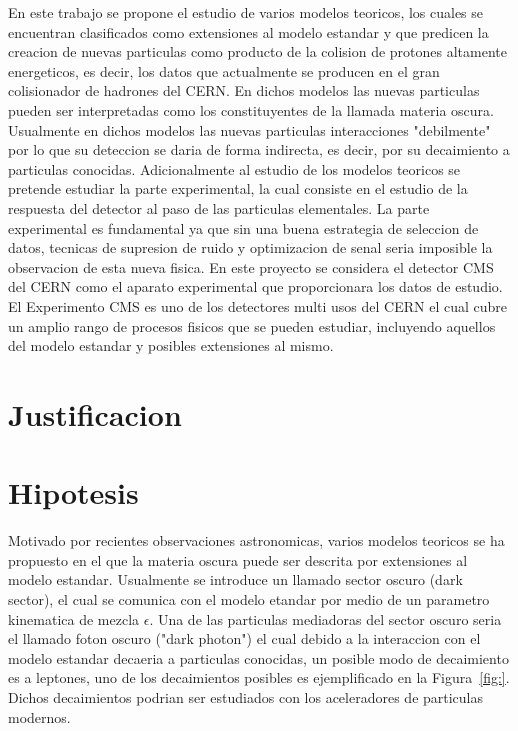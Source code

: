 En este trabajo se propone el estudio de varios modelos teoricos, los cuales se encuentran clasificados como extensiones al modelo estandar y que predicen la creacion de nuevas particulas como producto de la colision de protones altamente energeticos, es decir, los datos que actualmente se producen en el gran colisionador de hadrones del CERN.  En dichos modelos las nuevas particulas pueden ser interpretadas como los constituyentes de la llamada materia oscura.  Usualmente en dichos modelos las nuevas particulas interacciones "debilmente" por lo que su deteccion se daria de forma indirecta, es decir, por su decaimiento a particulas conocidas.  Adicionalmente al estudio de los modelos teoricos se pretende estudiar la parte experimental, la cual consiste en el estudio de la respuesta del detector al paso de las particulas elementales.  La parte experimental es fundamental ya que sin una buena estrategia de seleccion de datos, tecnicas de supresion de ruido y optimizacion de senal seria imposible la observacion de esta nueva fisica. En este proyecto se considera el detector CMS del CERN como el aparato experimental que proporcionara los datos de estudio.  El Experimento CMS es uno de los detectores multi usos del CERN el cual cubre un amplio rango de procesos fisicos que se pueden estudiar, incluyendo aquellos del modelo estandar y posibles extensiones al mismo. 


\chapter{Justificacion}



\chapter{Hipotesis}
Motivado por recientes observaciones astronomicas, varios modelos teoricos se ha propuesto en el que la materia oscura puede ser descrita por extensiones al modelo estandar. Usualmente se introduce un llamado sector oscuro (dark sector), el cual se comunica con el modelo etandar por medio de un parametro kinematica de mezcla $\epsilon$. Una de las particulas mediadoras del sector oscuro seria el llamado foton oscuro ("dark photon") el cual debido a la interaccion con el modelo estandar decaeria a particulas conocidas, un posible modo de decaimiento es a leptones, uno de los decaimientos posibles es ejemplificado en la Figura~\ref{fig:}.  Dichos decaimientos podrian ser estudiados con los aceleradores de particulas modernos. 


